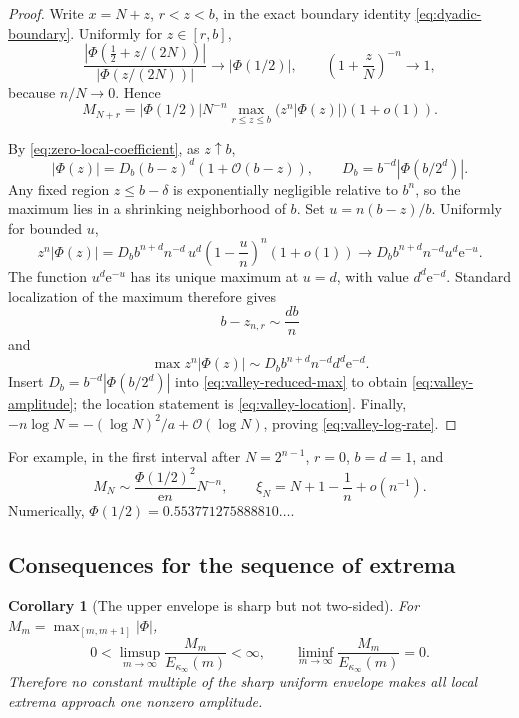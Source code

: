 \documentclass[11pt,oneside]{article}
\newtheorem{corollary}[theorem]{Corollary}
\theoremstyle{definition}
\theoremstyle{remark}
\newcommand{\e}{\mathrm e}
\newcommand{\Phiup}{\Phi}
\newcommand{\bigO}{\mathcal O}
\newcommand{\abs}[1]{\left|#1\right|}
\begin{document}
\begin{proof}
Write $x=N+z$, $r<z<b$, in the exact boundary identity
\eqref{eq:dyadic-boundary}.  Uniformly for $z\in[r,b]$,
\begin{equation}
 \frac{\abs{\Phiup(\tfrac12+z/(2N))}}
      {\abs{\Phiup(z/(2N))}}
 \longrightarrow\abs{\Phiup(1/2)},
 \qquad
 \left(1+\frac zN\right)^{-n}\longrightarrow1,
 \label{eq:valley-uniform-factors}
\end{equation}
because $n/N\to0$.  Hence
\begin{equation}
 M_{N+r}
 =\abs{\Phiup(1/2)}N^{-n}
   \max_{r\le z\le b}\bigl(z^n\abs{\Phiup(z)}\bigr)(1+o(1)).
 \label{eq:valley-reduced-max}
\end{equation}

By \eqref{eq:zero-local-coefficient}, as $z\uparrow b$,
\[
 \abs{\Phiup(z)}
 =D_b(b-z)^d(1+\bigO(b-z)),
 \qquad
 D_b=b^{-d}\abs{\Phiup(b/2^d)}.
\]
Any fixed region $z\le b-\delta$ is exponentially negligible relative to $b^n$, so the
maximum lies in a shrinking neighborhood of $b$.  Set
$u=n(b-z)/b$.  Uniformly for bounded $u$,
\[
 z^n\abs{\Phiup(z)}
 =D_b b^{n+d}n^{-d}\,u^d\left(1-\frac un\right)^n(1+o(1))
 \longrightarrow
 D_b b^{n+d}n^{-d}u^d\e^{-u}.
\]
The function $u^d\e^{-u}$ has its unique maximum at $u=d$, with value $d^d\e^{-d}$.
Standard localization of the maximum therefore gives
\[
 b-z_{n,r}\sim\frac{db}{n}
\]
and
\[
 \max z^n\abs{\Phiup(z)}
 \sim D_b b^{n+d}n^{-d}d^d\e^{-d}.
\]
Insert $D_b=b^{-d}\abs{\Phiup(b/2^d)}$ into
\eqref{eq:valley-reduced-max} to obtain \eqref{eq:valley-amplitude}; the location statement
is \eqref{eq:valley-location}.  Finally,
$-n\log N=-(\log N)^2/a+\bigO(\log N)$, proving
\eqref{eq:valley-log-rate}.
\end{proof}

For example, in the first interval after $N=2^{n-1}$, $r=0$, $b=d=1$, and
\begin{equation}
 M_N\sim\frac{\Phiup(1/2)^2}{\e n}N^{-n},
 \qquad
 \xi_N=N+1-\frac1n+o(n^{-1}).
 \label{eq:first-dyadic-valley}
\end{equation}
Numerically,
$\Phiup(1/2)=0.553771275888810\ldots$.

\subsection{Consequences for the sequence of extrema}

\begin{corollary}[The upper envelope is sharp but not two-sided]
\label{cor:extrema-limsup-liminf}
For $M_m=\max_{[m,m+1]}\abs{\Phiup}$,
\begin{equation}
 0<\limsup_{m\to\infty}\frac{M_m}{E_{\kappa_\infty}(m)}<\infty,
 \qquad
 \liminf_{m\to\infty}\frac{M_m}{E_{\kappa_\infty}(m)}=0.
 \label{eq:extrema-limsup-liminf}
\end{equation}
Therefore no constant multiple of the sharp uniform envelope makes all local extrema
approach one nonzero amplitude.
\end{corollary}
\end{document}
